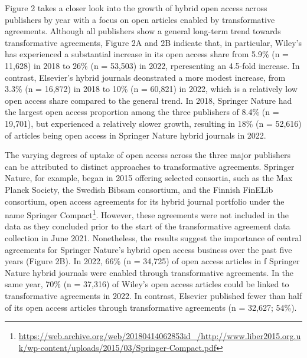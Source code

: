 \documentclass[a4paper,man,floatsintext,longtable,noextraspace,12pt]{apa6}
\begin{document}
Figure 2 takes a closer look into the growth of hybrid open access
across publishers by year with a focus on open articles enabled by
transformative agreements. Although all publishers show a general
long-term trend towards transformative agreements, Figure 2A and 2B
indicate that, in particular, Wiley's has experienced a substantial
increase in its open access share from 5.9\% (n = 11,628) in 2018 to
26\% (n = 53,503) in 2022, rperesenting an 4.5-fold increase. In
contrast, Elsevier's hybrid journals deonstrated a more modest increase,
from 3.3\% (n = 16,872) in 2018 to 10\% (n = 60,821) in 2022, which is a
relatively low open access share compared to the general trend. In 2018,
Springer Nature had the largest open access proportion among the three
publishers of 8.4\% (n = 19,701), but experienced a relatively slower
growth, resulting in 18\% (n = 52,616) of articles being open access in
Springer Nature hybrid journals in 2022.

The varying degrees of uptake of open access across the three major
publishers can be attributed to distinct approaches to transformative
agreements. Springer Nature, for example, began in 2015 offering
selected consortia, such as the Max Planck Society, the Swedish Bibsam
consortium, and the Finnish FinELib consortium, open access agreements
for its hybrid journal portfolio under the name Springer
Compact\footnote{\url{https://web.archive.org/web/20180414062853id_/http://www.liber2015.org.uk/wp-content/uploads/2015/03/Springer-Compact.pdf}}.
However, these agreements were not included in the data as they
concluded prior to the start of the transformative agreement data
collection in June 2021. Nonetheless, the results suggest the importance
of central agreements for Springer Nature's hybrid open access business
over the past five years (Figure 2B). In 2022, 66\% (n = 34,725) of open
access articles in f Springer Nature hybrid journals were enabled
through transformative agreements. In the same year, 70\% (n = 37,316)
of Wiley's open access articles could be linked to transformative
agreements in 2022. In contrast, Elsevier published fewer than half of
its open access articles through transformative agreements (n = 32,627;
54\%).
\end{document}
